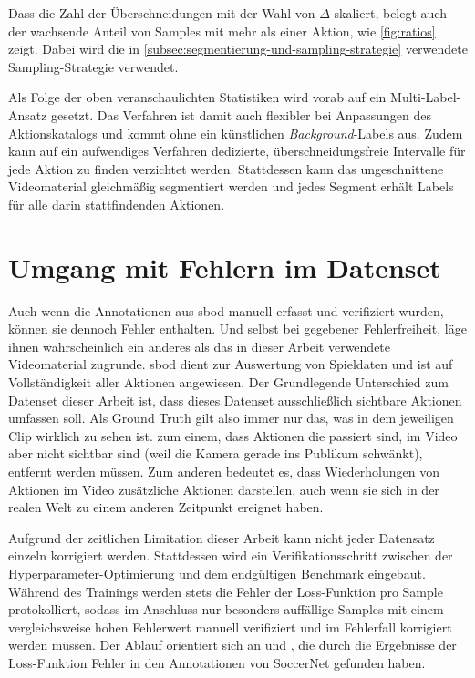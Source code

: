 Dass die Zahl der Überschneidungen mit der Wahl von $\Delta$ skaliert, belegt auch der wachsende Anteil von Samples mit mehr als einer Aktion, wie \autoref{fig:ratios} zeigt.
Dabei wird die in \autoref{subsec:segmentierung-und-sampling-strategie} verwendete Sampling-Strategie verwendet.

Als Folge der oben veranschaulichten Statistiken wird vorab auf ein Multi-Label-Ansatz gesetzt.
Das Verfahren ist damit auch flexibler bei Anpassungen des Aktionskatalogs und kommt ohne ein künstlichen \emph{Background}-Labels aus.
Zudem kann auf ein aufwendiges Verfahren dedizierte, überschneidungsfreie Intervalle für jede Aktion zu finden verzichtet werden.
Stattdessen kann das ungeschnittene Videomaterial gleichmäßig segmentiert werden und jedes Segment erhält Labels für alle darin stattfindenden Aktionen.

\section{Umgang mit Fehlern im Datenset}
\label{sec:umgang-mit-fehlern-in-datenset}

Auch wenn die Annotationen aus \gls{sbod} manuell erfasst und verifiziert wurden, können sie dennoch Fehler enthalten.
Und selbst bei gegebener Fehlerfreiheit, läge ihnen wahrscheinlich ein anderes als das in dieser Arbeit verwendete Videomaterial zugrunde.
\gls{sbod} dient zur Auswertung von Spieldaten und ist auf Vollständigkeit aller Aktionen angewiesen.
Der Grundlegende Unterschied zum Datenset dieser Arbeit ist, dass dieses Datenset ausschließlich sichtbare Aktionen umfassen soll.
Als Ground Truth gilt also immer nur das, was in dem jeweiligen Clip wirklich zu sehen ist.
\Dh zum einem, dass Aktionen die passiert sind, im Video aber nicht sichtbar sind (\zB weil die Kamera gerade ins Publikum schwänkt), entfernt werden müssen.
Zum anderen bedeutet es, dass Wiederholungen von Aktionen im Video zusätzliche Aktionen darstellen, auch wenn sie sich in der realen Welt zu einem anderen Zeitpunkt ereignet haben.

Aufgrund der zeitlichen Limitation dieser Arbeit kann nicht jeder Datensatz einzeln korrigiert werden.
Stattdessen wird ein Verifikationsschritt zwischen der Hyperparameter-Optimierung und dem endgültigen Benchmark eingebaut.
Während des Trainings werden stets die Fehler der Loss-Funktion pro Sample protokolliert, sodass im Anschluss nur besonders auffällige Samples mit einem vergleichsweise hohen Fehlerwert manuell verifiziert und im Fehlerfall korrigiert werden müssen.
Der Ablauf orientiert sich an \cite{Gugger20} und \cite{Cioppa20}, die durch die Ergebnisse der Loss-Funktion Fehler in den Annotationen von SoccerNet gefunden haben.

